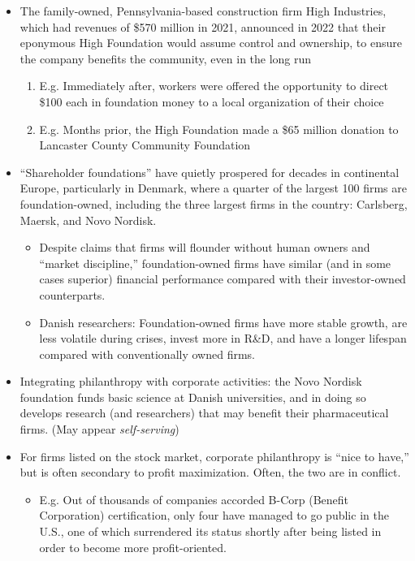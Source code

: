 \documentclass[oneside]{book}
\begin{document}
\begin{enumerate}
\begin{itemize}
\begin{itemize}
            \item The family-owned, Pennsylvania-based construction firm High Industries, which had revenues of \$570 million in 2021, announced in 2022 that their eponymous High Foundation would assume control and ownership, to ensure the company benefits the community, even in the long run
            \begin{enumerate}
                \item E.g. Immediately after, workers were offered the opportunity to direct \$100 each in foundation money to a local organization of their choice
                \item E.g. Months prior, the High Foundation made a \$65 million donation to Lancaster County Community Foundation
            \end{enumerate}
            \item ``Shareholder foundations'' have quietly prospered for decades in continental Europe, particularly in Denmark, where a quarter of the largest 100 firms are foundation-owned, including the three largest firms in the country: Carlsberg, Maersk, and Novo Nordisk.
            \begin{itemize}
                \item Despite claims that firms will flounder without human owners and “market discipline,” foundation-owned firms have similar (and in some cases superior) financial performance compared with their investor-owned counterparts. 
                \item Danish researchers: Foundation-owned firms have more stable growth, are less volatile during crises, invest more in R\&D, and have a longer lifespan compared with conventionally owned firms.  
            \end{itemize}
            \item Integrating philanthropy with corporate activities: the Novo Nordisk foundation funds basic science at Danish universities, and in doing so develops research (and researchers) that may benefit their pharmaceutical firms. (May appear \emph{self-serving})
            \item For firms listed on the stock market, corporate philanthropy is ``nice to have,'' but is often secondary to profit maximization. Often, the two are in conflict.
            \begin{itemize}
                \item E.g. Out of thousands of companies accorded B-Corp (Benefit Corporation) certification, only four have managed to go public in the U.S., one of which surrendered its status shortly after being listed in order to become more profit-oriented.

\end{itemize}
\end{itemize}
\end{itemize}
\end{enumerate}
\end{document}
